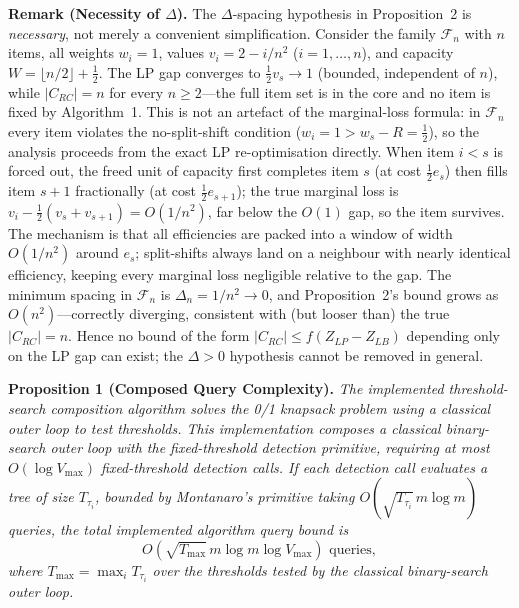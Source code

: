 \documentclass[conference]{IEEEtran}
\begin{document}
\textbf{Remark (Necessity of $\Delta$).} The $\Delta$-spacing hypothesis in Proposition~2 is \emph{necessary}, not merely a convenient simplification. Consider the family $\mathcal{F}_n$ with $n$ items, all weights $w_i = 1$, values $v_i = 2 - i/n^2$ ($i = 1, \ldots, n$), and capacity $W = \lfloor n/2 \rfloor + \tfrac{1}{2}$. The LP gap converges to $\tfrac{1}{2}v_s \to 1$ (bounded, independent of $n$), while $|C_{RC}| = n$ for every $n \ge 2$---the full item set is in the core and no item is fixed by Algorithm~1. This is not an artefact of the marginal-loss formula: in $\mathcal{F}_n$ every item violates the no-split-shift condition ($w_i = 1 > w_s - R = \tfrac{1}{2}$), so the analysis proceeds from the exact LP re-optimisation directly. When item $i < s$ is forced out, the freed unit of capacity first completes item $s$ (at cost $\tfrac{1}{2}e_s$) then fills item $s{+}1$ fractionally (at cost $\tfrac{1}{2}e_{s+1}$); the true marginal loss is $v_i - \tfrac{1}{2}(v_s + v_{s+1}) = O(1/n^2)$, far below the $O(1)$ gap, so the item survives. The mechanism is that all efficiencies are packed into a window of width $O(1/n^2)$ around $e_s$; split-shifts always land on a neighbour with nearly identical efficiency, keeping every marginal loss negligible relative to the gap. The minimum spacing in $\mathcal{F}_n$ is $\Delta_n = 1/n^2 \to 0$, and Proposition~2's bound grows as $O(n^2)$---correctly diverging, consistent with (but looser than) the true $|C_{RC}| = n$. Hence no bound of the form $|C_{RC}| \le f(Z_{LP} - Z_{LB})$ depending only on the LP gap can exist; the $\Delta > 0$ hypothesis cannot be removed in general.

\textbf{Proposition 1 (Composed Query Complexity).} \textit{The implemented threshold-search composition algorithm solves the 0/1 knapsack problem using a classical outer loop to test thresholds. This implementation composes a classical binary-search outer loop with the fixed-threshold detection primitive, requiring at most $O(\log V_{\max})$ fixed-threshold detection calls. If each detection call evaluates a tree of size $T_{\tau_i}$, bounded by Montanaro's primitive taking $O(\sqrt{T_{\tau_i}}\,m\log m)$ queries, the total implemented algorithm query bound is}
\begin{equation}
    O\!\left(\sqrt{T_{\max}}\,m\log m\log V_{\max}\right) \text{ queries},
    \label{eq:totalcomplexity}
\end{equation}
\textit{where $T_{\max} = \max_i T_{\tau_i}$ over the thresholds tested by the classical binary-search outer loop.}
\end{document}
